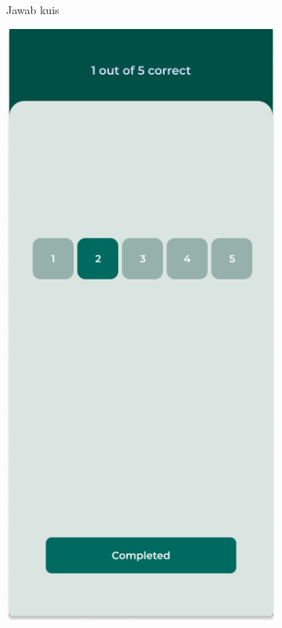 \begin{figure}[H]
\begin{subfigure}[b]{0.23\textwidth}
	  \caption{Jawab kuis}
	  \label{fig:midFi-login}
	\end{subfigure}
	\begin{subfigure}[b]{0.23\textwidth}
		\centering
	  \includegraphics[width=\linewidth]{contents/chapter-3/images/HF-kuis2.png}

\end{subfigure}
\end{figure}
